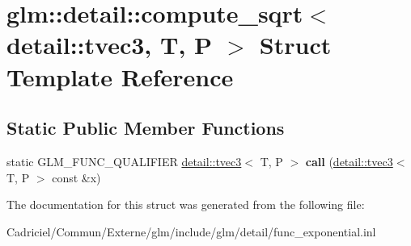 \hypertarget{structglm_1_1detail_1_1compute__sqrt_3_01detail_1_1tvec3_00_01_t_00_01_p_01_4}{}\section{glm\+:\+:detail\+:\+:compute\+\_\+sqrt$<$ detail\+:\+:tvec3, T, P $>$ Struct Template Reference}
\label{structglm_1_1detail_1_1compute__sqrt_3_01detail_1_1tvec3_00_01_t_00_01_p_01_4}
\subsection*{Static Public Member Functions}
\begin{DoxyCompactItemize}
\item 
static G\+L\+M\+\_\+\+F\+U\+N\+C\+\_\+\+Q\+U\+A\+L\+I\+F\+I\+ER \hyperlink{structglm_1_1detail_1_1tvec3}{detail\+::tvec3}$<$ T, P $>$ {\bfseries call} (\hyperlink{structglm_1_1detail_1_1tvec3}{detail\+::tvec3}$<$ T, P $>$ const \&x)\hypertarget{structglm_1_1detail_1_1compute__sqrt_3_01detail_1_1tvec3_00_01_t_00_01_p_01_4_a18a51ad87ca9848b797060c14651dafe}{}\label{structglm_1_1detail_1_1compute__sqrt_3_01detail_1_1tvec3_00_01_t_00_01_p_01_4_a18a51ad87ca9848b797060c14651dafe}

\end{DoxyCompactItemize}


The documentation for this struct was generated from the following file\+:\begin{DoxyCompactItemize}
\item 
Cadriciel/\+Commun/\+Externe/glm/include/glm/detail/func\+\_\+exponential.\+inl\end{DoxyCompactItemize}
